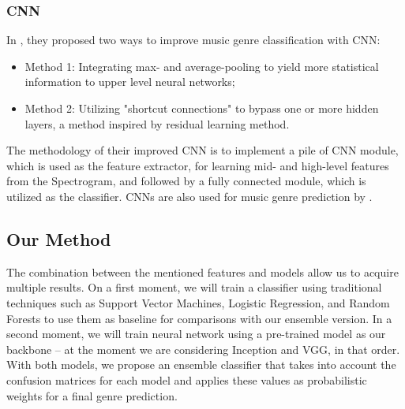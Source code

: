 \subsubsection{CNN}

In \citet{Zhang2016}, they proposed two ways to improve music genre classification with CNN:

\begin{itemize}
    \item Method 1: Integrating max- and average-pooling to yield more statistical information to upper level neural networks;
    \item Method 2: Utilizing "shortcut connections" to bypass one or more hidden layers, a method inspired by residual learning method.
\end{itemize}

The methodology of their improved CNN is to implement a pile of CNN module, which is used as the feature extractor, for learning mid- and high-level features from the Spectrogram, and followed by a fully connected module, which is utilized as the classifier. CNNs are also used for music genre prediction by \citet{Bahuleyan2018}.

\subsection{Our Method}

The combination between the mentioned features and models allow us to acquire multiple results. On a first moment, we will train a classifier using traditional techniques such as Support Vector Machines, Logistic Regression, and Random Forests to use them as baseline for comparisons with our ensemble version. In a second moment, we will train neural network using a pre-trained model as our backbone -- at the moment we are considering Inception and VGG, in that order. With both models, we propose an ensemble classifier that takes into account the confusion matrices for each model and applies these values as probabilistic weights for a final genre prediction.

